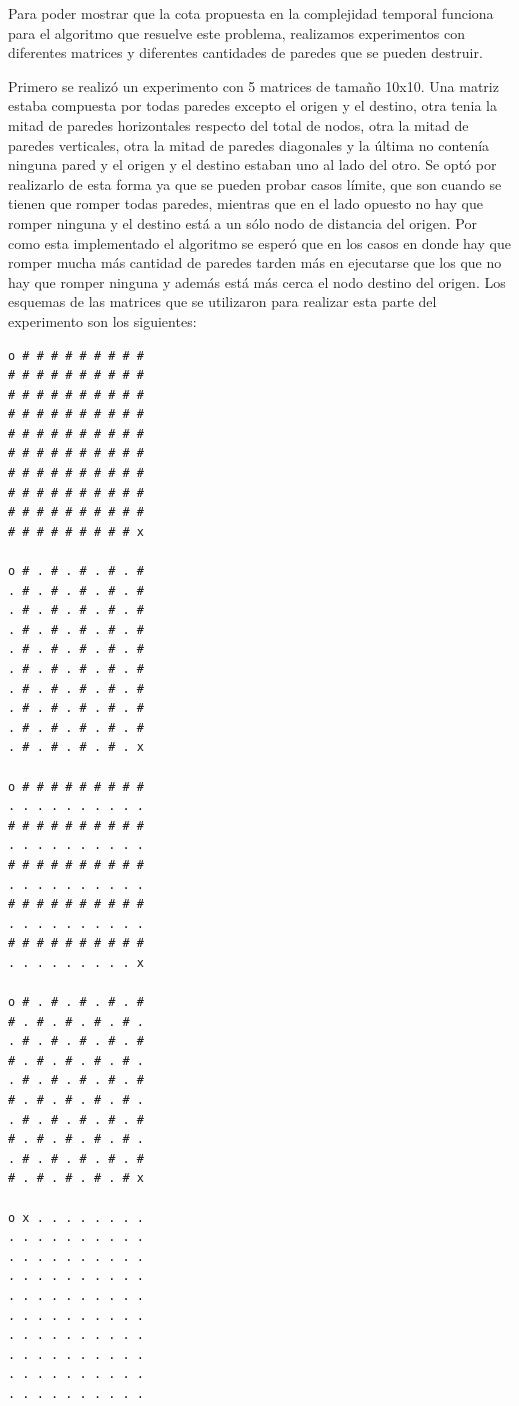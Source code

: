 	Para poder mostrar que la cota propuesta en la complejidad temporal funciona para el algoritmo que resuelve este problema, realizamos experimentos con diferentes matrices y diferentes cantidades de paredes que se pueden destruir.

  Primero se realizó un experimento con 5 matrices de tamaño 10x10. Una matriz estaba compuesta por todas paredes excepto el origen y el destino, otra tenia la mitad de paredes horizontales respecto del total de nodos, otra la mitad de paredes verticales, otra la mitad de paredes diagonales y la última no contenía ninguna pared y el origen y el destino estaban uno al lado del otro. Se optó por realizarlo de esta forma ya que se pueden probar casos límite, que son cuando se tienen que romper todas paredes, mientras que en el lado opuesto no hay que romper ninguna y el destino está a un sólo nodo de distancia del origen. Por como esta implementado el algoritmo se esperó que en los casos en donde hay que romper mucha más cantidad de paredes tarden más en ejecutarse que los que no hay que romper ninguna y además está más cerca el nodo destino del origen. Los esquemas de las matrices que se utilizaron para realizar esta parte del experimento son los siguientes:

 \begin{codesnippet}
            \begin{verbatim}
o # # # # # # # # #
# # # # # # # # # #
# # # # # # # # # #
# # # # # # # # # #
# # # # # # # # # #
# # # # # # # # # #
# # # # # # # # # #
# # # # # # # # # #
# # # # # # # # # #
# # # # # # # # # x

o # . # . # . # . #
. # . # . # . # . #
. # . # . # . # . #
. # . # . # . # . #
. # . # . # . # . #
. # . # . # . # . #
. # . # . # . # . #
. # . # . # . # . #
. # . # . # . # . #
. # . # . # . # . x

o # # # # # # # # #
. . . . . . . . . .
# # # # # # # # # #
. . . . . . . . . .
# # # # # # # # # #
. . . . . . . . . .
# # # # # # # # # #
. . . . . . . . . .
# # # # # # # # # #
. . . . . . . . . x

o # . # . # . # . #
# . # . # . # . # .
. # . # . # . # . #
# . # . # . # . # .
. # . # . # . # . #
# . # . # . # . # .
. # . # . # . # . #
# . # . # . # . # .
. # . # . # . # . #
# . # . # . # . # x

o x . . . . . . . .
. . . . . . . . . .
. . . . . . . . . .
. . . . . . . . . .
. . . . . . . . . .
. . . . . . . . . .
. . . . . . . . . .
. . . . . . . . . .
. . . . . . . . . .
. . . . . . . . . .

\end{verbatim}
            \end{codesnippet}

